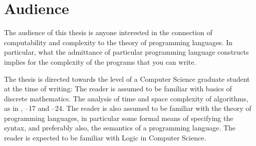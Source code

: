 
\section{Audience}

The audience of this thesis is anyone interested in the connection of
computability and complexity to the theory of programming languages. In
particular, what the admittance of particular programming language constructs
implies for the complexity of the programs that you can write.

\def\chs{\textsection\textsection}

The thesis is directed towards the level of a Computer Science graduate student
at the time of writing: The reader is assumed to be familiar with basics of
discrete mathematics. The analysis of time and space complexity of algorithms,
as in \cite{cormen-et-al-2009}, \chs1--17 and \chs21--24. The reader is also
assumed to be familiar with the theory of programming languages, in particular
some formal means of specifying the syntax, and preferably also, the semantics
of a programming language. The reader is expected to be familiar with Logic in
Computer Science.
